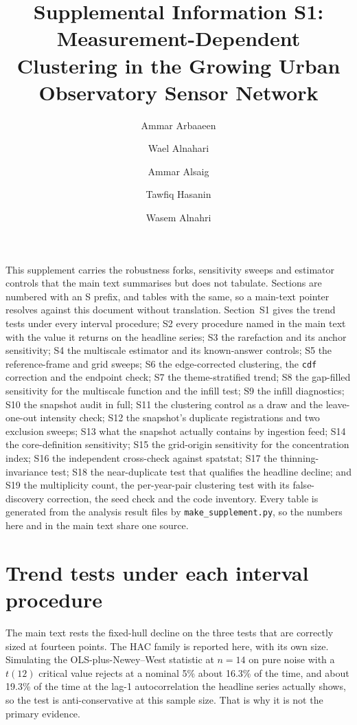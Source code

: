 \documentclass[fleqn,10pt]{wlpeerj}
\title{Supplemental Information S1: Measurement-Dependent Clustering in the Growing Urban Observatory
Sensor Network}
\author[2]{Ammar Arbaaeen}
\author[1]{Wael Alnahari}
\author[2]{Ammar Alsaig}
\author[1]{Tawfiq Hasanin}
\author[3]{Wasem Alnahri}
\affil[1]{Department of Information Systems, King Abdulaziz University, Jeddah 21589, Saudi Arabia}
\affil[2]{Department of Computer Science, Umm Al-Qura University, Mecca 24381, Saudi Arabia}
\affil[3]{Independent Researcher, Mecca 24331, Saudi Arabia}
\begin{document}
\flushbottom\maketitle\thispagestyle{empty}





\noindent This supplement carries the robustness forks, sensitivity sweeps and estimator
controls that the main text summarises but does not tabulate. Sections are numbered with an
S prefix, and tables with the same, so a main-text pointer resolves against this document
without translation. Section~S1 gives the trend tests
under every interval procedure; S2 every procedure named in the main text with the value it
returns on the headline series; S3 the rarefaction and its anchor sensitivity; S4 the
multiscale estimator and its known-answer controls; S5 the reference-frame and grid sweeps;
S6 the edge-corrected clustering, the \texttt{cdf} correction and the endpoint check; S7 the
theme-stratified trend; S8 the gap-filled sensitivity for the multiscale function and the
infill test; S9 the infill diagnostics; S10 the snapshot audit in full; S11 the
clustering control as a draw and the leave-one-out intensity check; S12 the snapshot's duplicate
registrations and two exclusion sweeps; S13 what the snapshot actually contains by ingestion
feed; S14 the core-definition sensitivity; S15 the grid-origin sensitivity for the concentration
index; S16 the independent cross-check against \textsf{spatstat}; S17 the thinning-invariance
test; S18 the near-duplicate test that qualifies the headline decline; and S19 the multiplicity
count, the per-year-pair clustering test with its false-discovery correction, the seed check and
the code
inventory. Every
table is generated from the analysis result files by
\texttt{make\_supplement.py}, so the numbers here and in the main text share one source.

\section{Trend tests under each interval procedure}
\label{si:inference}

The main text rests the fixed-hull decline on the three tests that are correctly sized at
fourteen points. The HAC family is reported here, with its own size. Simulating the
OLS-plus-Newey--West statistic at $n = 14$ on pure noise with a $t(12)$ critical value rejects
at a nominal 5\% about 16.3\% of the time, and about 19.3\% of the time at the lag-1
autocorrelation the headline series actually shows, so the test is anti-conservative at this sample size. That is why it is
not the primary evidence.
\end{document}
